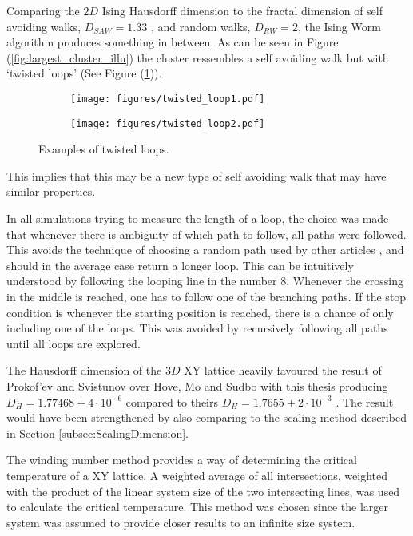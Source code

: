 Comparing the $2D$ Ising Hausdorff dimension to the fractal dimension of self avoiding walks, $D_{SAW} = 1.33$ \cite{Vilgis:FlorySAW}, and random walks, $D_{RW} = 2$, the Ising Worm algorithm produces something in between. As can be seen in Figure (\ref{fig:largest_cluster_illu}) the cluster ressembles a self avoiding walk but with `twisted loops' (See Figure (\ref{fig:twisted_loops})).

\begin{figure}[h!]
\centering
    \begin{subfigure}{.4\textwidth}
        \centering
        \texttt{[image: figures/twisted\_loop1.pdf]}
    \end{subfigure}
    \begin{subfigure}{.4\textwidth}
        \centering
        \texttt{[image: figures/twisted\_loop2.pdf]}
    \end{subfigure}
    \caption{Examples of twisted loops.}
\label{fig:twisted_loops}
\end{figure}

This implies that this may be a new type of self avoiding walk that may have similar properties.

In all simulations trying to measure the length of a loop, the choice was made that whenever there is ambiguity of which path to follow, all paths were followed. This avoids the technique of choosing a random path used by other articles \cite{Hove:hausdorff_crit_fluctuations}, and should in the average case return a longer loop. This can be intuitively understood by following the looping line in the number $8$. Whenever the crossing in the middle is reached, one has to follow one of the branching paths. If the stop condition is whenever the starting position is reached, there is a chance of only including one of the loops. This was avoided by recursively following all paths until all loops are explored.

The Hausdorff dimension of the $3D$ XY lattice heavily favoured the result of Prokof'ev and Svistunov over Hove, Mo and Sudbo with this thesis producing $D_H = 1.77468 \pm 4 \cdot 10^{-6}$ compared to theirs $D_H = 1.7655 \pm 2 \cdot 10^{-3}$ \cite{Prokofev:comment_on_hove_hausdorff_crit_fluct}. The result would have been strengthened by also comparing to the scaling method described in Section \ref{subsec:ScalingDimension}.

The winding number method provides a way of determining the critical temperature of a XY lattice. A weighted average of all intersections, weighted with the product of the linear system size of the two intersecting lines, was used to calculate the critical temperature. This method was chosen since the larger system was assumed to provide closer results to an infinite size system.

